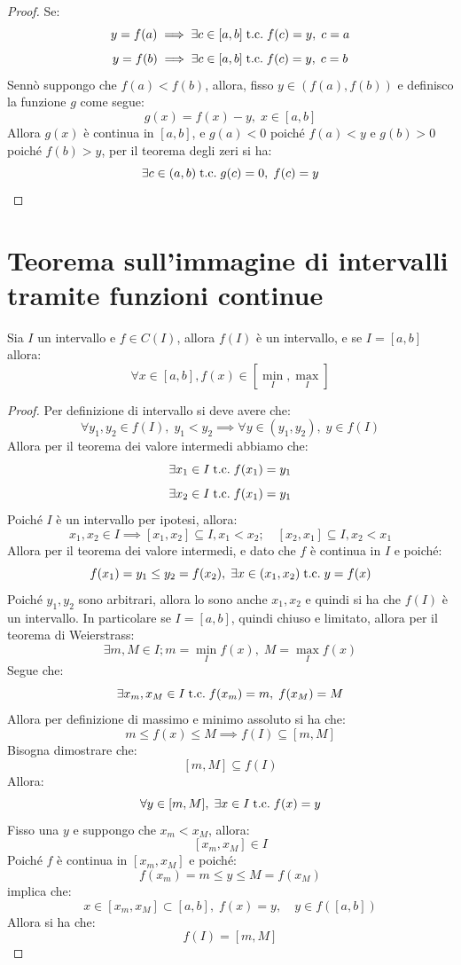 \documentclass[a4paper,12pt,openright]{book}
\begin{document}
    \begin{proof}
    	Se: 
    	\[y = f(a) \implies \exists c \in [a, b] \;\text{t.c.}\; f(c) = y, \; c = a\]
    	\[y = f(b) \implies \exists c \in [a, b] \;\text{t.c.}\; f(c) = y, \; c = b\]
    	Sennò suppongo che $f(a) < f(b)$, allora, fisso $y \in (f(a), f(b))$ e definisco la funzione $g$ come segue:
   		\[g(x) = f(x) - y, \; x \in [a, b]\]
   		Allora $g(x)$ è continua in $[a, b]$, e $g(a) < 0$ poiché $f(a) < y$ e $g(b) > 0$ poiché $f(b) > y$, per il teorema degli zeri si ha:
   		\[\exists c \in (a, b) \;\text{t.c.}\; g(c) = 0, \; f(c) = y\]
    \end{proof}
    
    \newpage
    
    \section{Teorema sull'immagine di intervalli tramite funzioni continue}
    Sia $I$ un intervallo e $f \in C(I)$, allora $f(I)$ è un intervallo, e se $I = [a, b]$ allora:
    \[\forall x \in [a, b], f(x) \in [\min_I, \max_I]\]
    
    \begin{proof}
    	Per definizione di intervallo si deve avere che:
    	\[\forall y_1, y_2 \in f(I), \; y_1 < y_2 \implies \forall y \in (y_1, y_2), \; y \in f(I)\]
    	Allora per il teorema dei valore intermedi abbiamo che:
    	\[\exists x_1 \in I \;\text{t.c.}\; f(x_1) = y_1\]
    	\[\exists x_2 \in I \;\text{t.c.}\; f(x_1) = y_1\]
    	Poiché $I$ è un intervallo per ipotesi, allora:
    	\[x_1, x_2 \in I \implies [x_1, x_2] \subseteq I, x_1 < x_2; \quad [x_2, x_1] \subseteq I, x_2 < x_1\] 
    	Allora per il teorema dei valore intermedi, e dato che $f$ è continua in $I$ e poiché:
    	\[f(x_1) = y_1 \leq y_2 = f(x_2), \; \exists x \in (x_1, x_2) \;\text{t.c.}\; y = f(x)\]
    	Poiché $y_1, y_2$ sono arbitrari, allora lo sono anche $x_1, x_2$ e quindi si ha che $f(I)$ è un intervallo.
    	\newline
    	In particolare se $I = [a, b]$, quindi chiuso e limitato, allora per il teorema di Weierstrass:
    	\[\exists m, M \in I; m = \min_I f(x), \; M = \max_I f(x)\]
    	Segue che:
    	\[\exists x_m, x_M \in I \;\text{t.c.}\; f(x_m) = m, \; f(x_M) = M\]
    	Allora per definizione di massimo e minimo assoluto si ha che:
    	\[m \leq f(x) \leq M \implies f(I) \subseteq [m, M]\]
    	Bisogna dimostrare che:
    	\[[m, M] \subseteq f(I)\]
    	Allora:
    	\[\forall y \in [m, M], \; \exists x \in I \;\text{t.c.}\; f(x) = y\]
    	Fisso una $y$ e suppongo che $x_m < x_M$, allora:
    	\[[x_m , x_M] \in I\]
    	Poiché $f$ è continua in $[x_m, x_M]$ e poiché:
    	\[f(x_m) = m \leq y \leq M = f(x_M)\]
    	implica che:
    	\[x \in [x_m, x_M] \subset [a, b], \; f(x) = y, \quad y \in f([a, b])\]
    	Allora si ha che:
    	\[f(I) = [m, M]\]    	
    \end{proof}
    
\end{document}
